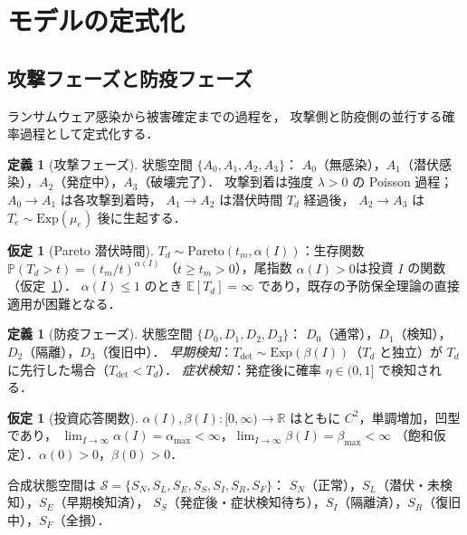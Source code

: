 \documentclass[12pt,a4paper]{article}
\theoremstyle{plain}
\theoremstyle{definition}
\newtheorem{definition}[theorem]{定義}
\newtheorem{assumption}[theorem]{仮定}
\theoremstyle{remark}
\newcommand{\E}{\mathbb{E}}
\newcommand{\Prob}{\mathbb{P}}
\newcommand{\Tdet}{T_{\mathrm{det}}}
\newcommand{\betaI}{\beta(I)}
\newcommand{\alphI}{\alpha(I)}
\begin{document}
\section{モデルの定式化}
\label{sec:model}

\subsection{攻撃フェーズと防疫フェーズ}

ランサムウェア感染から被害確定までの過程を，
攻撃側と防疫側の並行する確率過程として定式化する．

\begin{definition}[攻撃フェーズ]\label{def:attack}
状態空間 $\{A_0,A_1,A_2,A_3\}$：
$A_0$（無感染），$A_1$（潜伏感染），$A_2$（発症中），$A_3$（破壊完了）．
攻撃到着は強度 $\lambda>0$ の Poisson 過程；
$A_0\to A_1$ は各攻撃到着時，
$A_1\to A_2$ は潜伏時間 $T_d$ 経過後，
$A_2\to A_3$ は $T_e\sim\mathrm{Exp}(\mu_e)$ 後に生起する．
\end{definition}

\begin{assumption}[Pareto 潜伏時間]\label{ass:pareto}
$T_d\sim\mathrm{Pareto}(t_m,\alphI)$：生存関数 $\Prob(T_d>t)=(t_m/t)^{\alphI}$
（$t\ge t_m>0$），尾指数 $\alphI>0$は投資 $I$ の関数（仮定~\ref{ass:invest}）．
$\alphI\le1$ のとき $\E[T_d]=\infty$ であり，既存の予防保全理論の直接適用が困難となる．
\end{assumption}

\begin{definition}[防疫フェーズ]\label{def:defense}
状態空間 $\{D_0,D_1,D_2,D_3\}$：
$D_0$（通常），$D_1$（検知），$D_2$（隔離），$D_3$（復旧中）．
\emph{早期検知}：$\Tdet\sim\mathrm{Exp}(\betaI)$（$T_d$ と独立）が $T_d$ に先行した場合（$\Tdet<T_d$）．
\emph{症状検知}：発症後に確率 $\eta\in(0,1]$ で検知される．
\end{definition}

\begin{assumption}[投資応答関数]\label{ass:invest}
$\alphI,\betaI:[0,\infty)\to\mathbb{R}$ はともに $C^2$，単調増加，凹型であり，
$\lim_{I\to\infty}\alphI=\alpha_{\max}<\infty$，$\lim_{I\to\infty}\betaI=\beta_{\max}<\infty$
（飽和仮定）．$\alpha(0)>0$，$\beta(0)>0$．
\end{assumption}

合成状態空間は $\mathcal{S}=\{S_N,S_L,S_E,S_S,S_I,S_R,S_F\}$：
$S_N$（正常），$S_L$（潜伏・未検知），$S_E$（早期検知済），
$S_S$（発症後・症状検知待ち），$S_I$（隔離済），$S_R$（復旧中），$S_F$（全損）．
\end{document}
